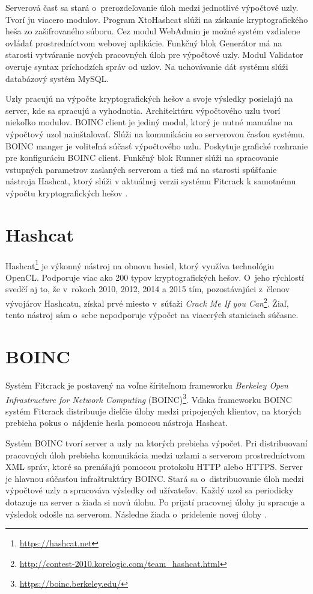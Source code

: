 \documentclass[slovak]{fitthesis}
\begin{document}
Serverová časť sa stará o~prerozdeľovanie úloh medzi jednotlivé výpočtové uzly. Tvorí ju viacero modulov. Program XtoHashcat slúži na získanie kryptografického heša zo zašifrovaného súboru. Cez modul WebAdmin je možné systém vzdialene ovládať prostredníctvom webovej aplikácie. Funkčný blok Generátor má na starosti vytváranie nových pracovných úloh pre výpočtové uzly. Modul Validator overuje syntax príchodzích správ od uzlov. Na uchovávanie dát systému slúži databázový systém MySQL.

Uzly pracujú na výpočte kryptografických hešov a svoje výsledky posielajú na server, kde sa spracujú a vyhodnotia. Architektúru výpočtového uzlu tvorí niekoľko modulov. BOINC client je jediný modul, ktorý je nutné manuálne na výpočtový uzol nainštalovať. Slúži na komunikáciu so serverovou časťou systému. BOINC manger je voliteľná súčasť výpočtového uzlu. Poskytuje grafické rozhranie pre konfiguráciu BOINC client. Funkčný blok Runner slúži na spracovanie vstupných parametrov zaslaných serverom a tiež má na starosti spúšťanie nástroja Hashcat, ktorý slúži v aktuálnej verzii systému Fitcrack k samotnému výpočtu kryptografických hešov \cite{fitcrackSprava}.



\section{Hashcat}\label{hashcat}
Hashcat\footnote{\url{https://hashcat.net}} je výkonný nástroj na obnovu hesiel, ktorý využíva technológiu OpenCL. Podporuje viac ako 200 typov kryptografických hešov. O~jeho rýchlostí svedčí aj to, že v~rokoch 2010, 2012, 2014 a 2015 tím, pozostávajúci z~členov vývojárov Hashcatu, získal prvé miesto v~súťaži \textit{Crack Me If you Can}\footnote{\url{http://contest-2010.korelogic.com/team_hashcat.html}}. Žiaľ, tento nástroj sám o~sebe nepodporuje výpočet na viacerých staniciach súčasne.


\section{BOINC} \label{BOINC}
Systém Fitcrack je postavený na voľne šíriteľnom frameworku \textit{Berkeley Open Infrastructure for Network Computing} (BOINC)\footnote{\url{https://boinc.berkeley.edu/}}. Vďaka frameworku BOINC systém Fitcrack distribuuje dielčie úlohy medzi pripojených klientov, na ktorých prebieha pokus o~nájdenie hesla pomocou nástroja Hashcat.

Systém BOINC tvorí server a uzly na ktorých prebieha výpočet. Pri distribuovaní pracovných úloh prebieha komunikácia medzi uzlami a serverom prostredníctvom XML správ, ktoré sa prenášajú pomocou protokolu HTTP alebo HTTPS.
Server je hlavnou súčasťou infraštruktúry BOINC. Stará sa o~distribuovanie úloh medzi výpočtové uzly a spracováva výsledky od užívateľov. Každý uzol sa periodicky dotazuje na server a žiada si novú úlohu. Po prijatí pracovnej úlohy ju spracuje a výsledok odošle na serverom. Následne žiada o~pridelenie novej úlohy \cite{boinccitace}.
\end{document}
